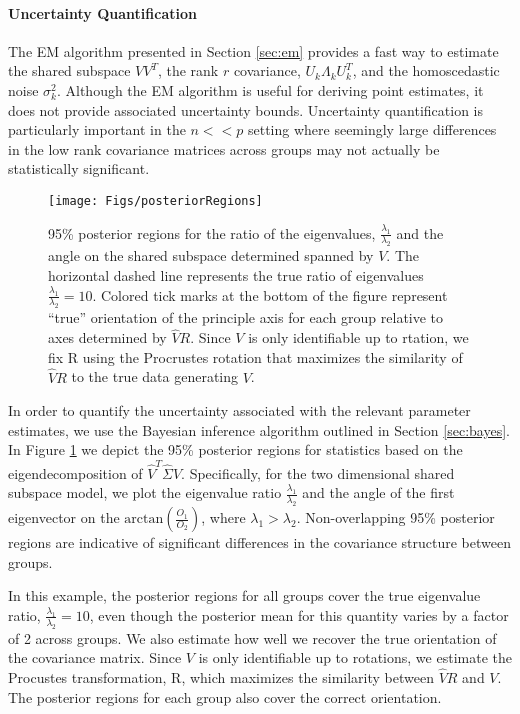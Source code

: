 \documentclass{article}
\begin{document}
\paragraph{Uncertainty Quantification}

The EM algorithm presented in Section \ref{sec:em} provides a fast way
to estimate the shared subspace $VV^T$, the rank $r$ covariance,
$U_k\Lambda_kU_k^T$, and the homoscedastic noise $\sigma_k^2$.
Although the EM algorithm is useful for deriving point estimates, it
does not provide associated uncertainty bounds.  Uncertainty
quantification is particularly important in the $n << p$ setting where
seemingly large differences in the low rank covariance matrices across groups may not
actually be statistically significant.  

\begin{figure}[!ht]
  \centering
    \texttt{[image: Figs/posteriorRegions]}
    \caption{95\% posterior regions for the ratio of the eigenvalues,
      $\frac{\lambda_1}{\lambda_2}$ and the angle on the shared
      subspace determined spanned by $V$.  The horizontal dashed line
      represents the true ratio of eigenvalues
      $\frac{\lambda_1}{\lambda_2} = 10$.  Colored tick marks at the
      bottom of the figure represent ``true'' orientation of the
      principle axis for each group relative to axes determined by
      $\hat{V}R$.  Since $V$ is only identifiable up to rtation, we
      fix R using the Procrustes rotation that maximizes the
      similarity of $\hat{V}R$ to the true data generating $V$. }
\label{fig:posteriorRegions}
\end{figure}

In order to quantify the uncertainty associated with the relevant
parameter estimates, we use the Bayesian inference algorithm outlined
in Section \ref{sec:bayes}. In Figure \ref{fig:posteriorRegions} we
depict the 95\% posterior regions for statistics based on the
eigendecomposition of $\hat{V}^T\hat{\Sigma}\hat{V}$.  Specifically,
for the two dimensional shared subspace model, we plot the eigenvalue
ratio $\frac{\lambda_1}{\lambda_2}$ and the angle of the first
eigenvector on the $\text{arctan}(\frac{O_1}{O_2})$, where
$\lambda_1 > \lambda_2$.  Non-overlapping 95\% posterior regions are
indicative of significant differences in the covariance structure
between groups.

In this example, the posterior regions for all groups cover the true
eigenvalue ratio, $\frac{\lambda_1}{\lambda_2} = 10$, even though the
posterior mean for this quantity varies by a factor of 2 across groups.  We also
estimate how well we recover the true orientation of the covariance
matrix.  Since $V$ is only identifiable up to rotations, we estimate
the Procustes transformation, R, which maximizes the similarity
between $\hat{V}R$ and $V$.  The posterior regions for each group also
cover the correct orientation.
\end{document}
